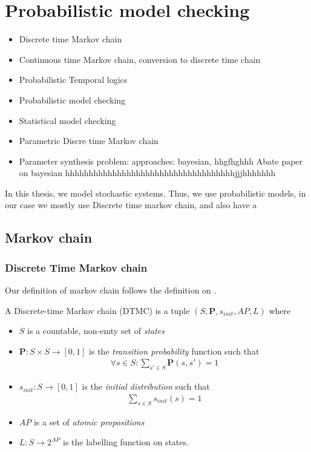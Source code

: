 \chapter{Probabilistic model checking}
 {\color{red}
  \begin{itemize}
      \item Discrete time Markov chain
      \item Continuous time Markov chain, conversion to discrete time chain
      \item Probabilistic Temporal logics
      \item Probabilistic model checking
      \item Statistical model checking
      \item Parametric Discre time Markov chain
      \item Parameter synthesis problem: approaches: bayesian, hhgfhghhh Abate paper on bayesian hhhhhhhhhhhhhhhhhhhhhhhhhhhhhhhhhhhhjjjhhhhhhh
  \end{itemize}
 }

In this thesis, we model stochastic systems. Thus, we use probabilistic models, in our case we mostly use Discrete time markov chain, and also have a

\section{Markov chain}
\subsection{Discrete Time Markov chain}
Our definition of markov chain follows the definition on \cite{baier2008principles}.
\begin{definition}
    A Discrete-time Markov chain (DTMC) is a tuple $(S,\mathbf{P}, s_{init}, AP, L)$ where
    \begin{itemize}
        \item $S$ is a countable, non-emty set of \textit{states}
        \item $\mathbf{P}:S\times S \rightarrow [0,1]$ is the \textit{transition probability}
              function such that
              \begin{align*}
                  \forall s \in S : \sum_{s'\in S}\mathbf{P}(s, s') = 1
              \end{align*}
        \item $s_{init}: S \rightarrow [0,1]$ is the \textit{initial distribution} such that
              \begin{align*}
                  \sum_{s\in S}s_{init}(s) = 1
              \end{align*}
        \item $AP$ is a set of \textit{atomic propositions}
        \item $L: S \rightarrow 2^{AP}$ is the labelling function on states.
    \end{itemize}
\end{definition}


